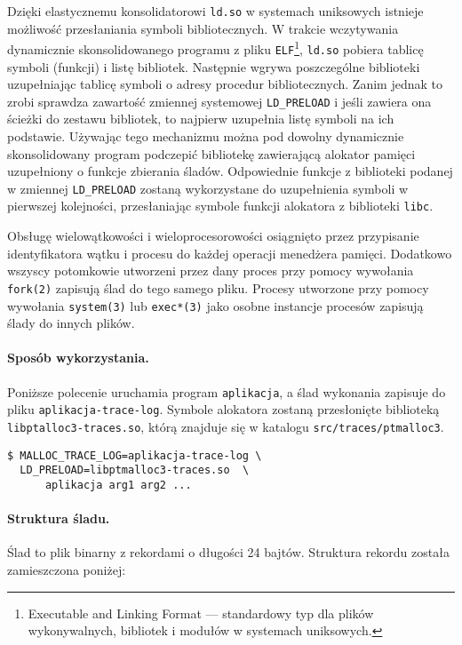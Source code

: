 \documentclass[12pt,a4paper,titlepage,twoside]{mwart}
\begin{document}
Dzięki elastycznemu konsolidatorowi \texttt{ld.so} w systemach uniksowych
istnieje możliwość przesłaniania symboli bibliotecznych. W trakcie wczytywania
dynamicznie skonsolidowanego programu z pliku \texttt{ELF}\footnote{Executable
and Linking Format --- standardowy typ dla plików wykonywalnych, bibliotek i
modułów w systemach uniksowych.}, \texttt{ld.so} pobiera tablicę symboli
(funkcji) i listę bibliotek. Następnie wgrywa poszczególne biblioteki
uzupełniając tablicę symboli o adresy procedur bibliotecznych. Zanim jednak to
zrobi sprawdza zawartość zmiennej systemowej \texttt{LD\_PRELOAD} i jeśli
zawiera ona ścieżki do zestawu bibliotek, to najpierw uzupełnia listę symboli
na ich podstawie. Używając tego mechanizmu można pod dowolny dynamicznie
skonsolidowany program podczepić bibliotekę zawierającą alokator pamięci
uzupełniony o funkcje zbierania śladów. Odpowiednie funkcje z biblioteki
podanej w zmiennej \texttt{LD\_PRELOAD} zostaną wykorzystane do uzupełnienia
symboli w pierwszej kolejności, przesłaniając symbole funkcji alokatora z
biblioteki \texttt{libc}.

Obsługę wielowątkowości i wieloprocesorowości osiągnięto przez przypisanie
identyfikatora wątku i procesu do każdej operacji menedżera pamięci. Dodatkowo
wszyscy potomkowie utworzeni przez dany proces przy pomocy wywołania
\texttt{fork(2)} zapisują ślad do tego samego pliku. Procesy utworzone przy
pomocy wywołania \texttt{system(3)} lub \texttt{exec*(3)} jako osobne instancje
procesów zapisują ślady do innych plików.

\paragraph{Sposób wykorzystania.} Poniższe polecenie uruchamia program
\texttt{aplikacja}, a ślad wykonania zapisuje do pliku
\texttt{aplikacja-trace-log}. Symbole alokatora zostaną przesłonięte
biblioteką \texttt{libptalloc3-traces.so}, którą znajduje się w katalogu
\texttt{src/traces/ptmalloc3}.
\begin{center}
\begin{verbatim}
$ MALLOC_TRACE_LOG=aplikacja-trace-log \
  LD_PRELOAD=libptmalloc3-traces.so  \
      aplikacja arg1 arg2 ...
\end{verbatim}
\end{center}

\paragraph{Struktura śladu.} Ślad to plik binarny z rekordami o długości 24
bajtów. Struktura rekordu została zamieszczona poniżej:
\end{document}
